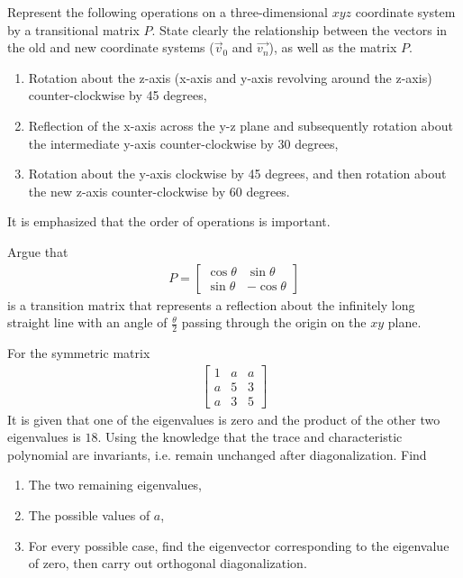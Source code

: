 \begin{Exercise}
Represent the following operations on a three-dimensional $xyz$ coordinate system by a transitional matrix $P$. State clearly the relationship between the vectors in the old and new coordinate systems ($\vec{v}_0$ and $\vec{v_n}$), as well as the matrix $P$.
\begin{enumerate}[label=(\alph*)]
\item Rotation about the z-axis (x-axis and y-axis revolving around the z-axis) counter-clockwise by 45 degrees,
\item Reflection of the x-axis across the y-z plane and subsequently rotation about the intermediate y-axis counter-clockwise by 30 degrees,
\item Rotation about the y-axis clockwise by 45 degrees, and then rotation about the new z-axis counter-clockwise by 60 degrees.
\end{enumerate}
It is emphasized that the order of operations is important.
\end{Exercise}

\begin{Exercise}
Argue that
\begin{align*}
P = 
\begin{bmatrix}
\cos{\theta} & \sin{\theta} \\
\sin{\theta} & -\cos{\theta}
\end{bmatrix}
\end{align*}
is a transition matrix that represents a reflection about the infinitely long straight line with an angle of $\frac{\theta}{2}$ passing through the origin on the $xy$ plane.
\end{Exercise}

\begin{Exercise}
For the symmetric matrix 
\begin{align*}
\begin{bmatrix}
1 & a & a\\
a & 5 & 3\\
a & 3 & 5
\end{bmatrix}
\end{align*}
It is given that one of the eigenvalues is zero and the product of the other two eigenvalues is $18$. Using the knowledge that the trace and characteristic polynomial are invariants, i.e. remain unchanged after diagonalization. Find 
\begin{enumerate}[label=(\alph*)]
\item The two remaining eigenvalues,
\item The possible values of $a$,
\item For every possible case, find the eigenvector corresponding to the eigenvalue of zero, then carry out orthogonal diagonalization.
\end{enumerate}
\end{Exercise}

